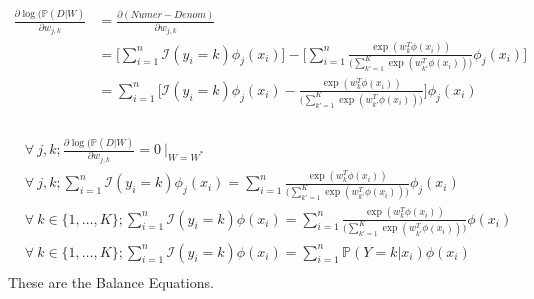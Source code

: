 \documentclass[12pt, fleqn]{article}
\begin{document}
\subsubsection{}
\begin{equation*}
  \begin{aligned}
    \frac{\partial \log (\mathbb{P}(D|W)}{\partial w_{j,k}} & = \frac{\partial (Numer - Denom)}{\partial w_{j,k}}                                                                                                                                           \\
                                                            & = \bigg[ \sum_{i=1}^n \mathcal{I}(y_i = k) \phi_j(x_i) \bigg] - \bigg[ \sum_{i=1}^n \frac{\exp (w_{k}^T \phi(x_i))}{\bigg( \sum_{k'=1}^K \exp (w_{k'}^T \phi(x_i)) \bigg)} \phi_j(x_i) \bigg] \\
                                                            & = \sum_{i=1}^n \bigg[ \mathcal{I}(y_i = k) \phi_j(x_i) - \frac{\exp (w_{k}^T \phi(x_i))}{\bigg( \sum_{k'=1}^K \exp (w_{k'}^T \phi(x_i)) \bigg)} \bigg] \phi_j(x_i)
  \end{aligned}
\end{equation*}

\subsubsection{}
\begin{equation*}
  \begin{aligned}
     & \forall \ j,k;  \frac{\partial \log (\mathbb{P}(D|W)}{\partial w_{j,k}} = 0 \ \bigg\vert_{W = W^*}                                                                                           \\
     & \forall \ j,k;  \sum_{i=1}^n \mathcal{I}(y_i = k) \phi_j(x_i) = \sum_{i=1}^n \frac{\exp (w_{k}^T \phi(x_i))}{\bigg( \sum_{k'=1}^K \exp (w_{k'}^T \phi(x_i)) \bigg)} \phi_j(x_i)              \\
     & \forall \ k \in \{1, \dots, K\}; \sum_{i=1}^n \mathcal{I}(y_i = k) \phi(x_i) = \sum_{i=1}^n \frac{\exp (w_{k}^T \phi(x_i))}{\bigg( \sum_{k'=1}^K \exp (w_{k'}^T \phi(x_i)) \bigg)} \phi(x_i) \\
     & \forall \ k \in \{1, \dots, K\}; \sum_{i=1}^n \mathcal{I}(y_i = k) \phi(x_i) = \sum_{i=1}^n \mathbb{P}(Y = k | x_i) \phi(x_i)                                                                \\
  \end{aligned}
\end{equation*}
These are the Balance Equations.
\end{document}
